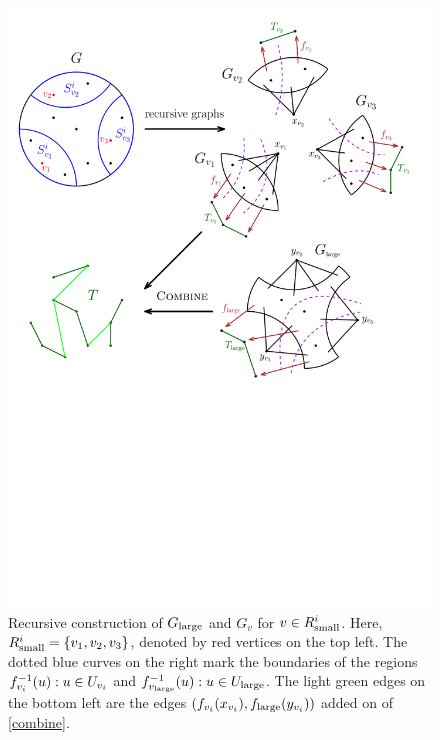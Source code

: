 \begin{figure}\centering
\includegraphics[scale=.5]{recursion.pdf}
\caption{Recursive construction of $G_{\textup{large}}$ and $G_v$ for $v\in R^i_{\textup{small}}$. Here, $R^i_{\textup{small}}=\{v_1,v_2,v_3\}$, denoted by red vertices on the top left. The dotted blue curves on the right mark the boundaries of the regions $f_{v_i}^{-1}(u):u\in U_{v_i}$ and $f_{v_{\textup{large}}}^{-1}(u):u\in U_{\textup{large}}$. The light green edges on the bottom left are the edges $(f_{v_i}(x_{v_i}),f_{\textup{large}}(y_{v_i}))$ added on  of \ref{combine}.}\label{fig:recursion}
\end{figure}


